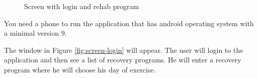 \begin{figure}[!htb]
  \centering
  \hfill
    \caption{Screen with login and rehab program}
\end{figure}


You need a phone to run the application that has 
android operating system with a minimal version 9.

The window in Figure \ref{fig:screen-login} will appear.
The user will login to the application and then see a list of recovery programs.
He will enter a recovery program where he will choose his day of exercise.

